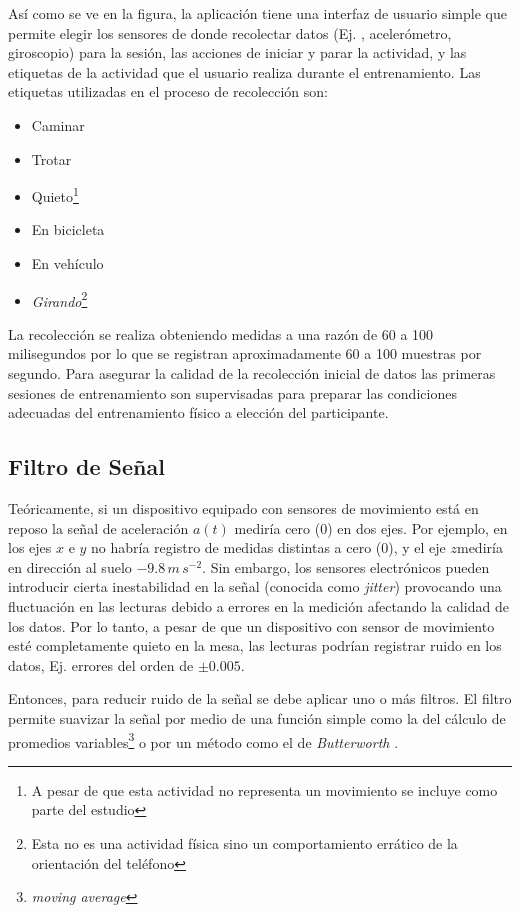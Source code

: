 Así como se ve en la figura, la aplicación tiene una interfaz de usuario
simple que permite elegir los sensores de donde recolectar datos (Ej.
, acelerómetro, giroscopio) para la sesión, las acciones
de iniciar y parar la actividad, y las etiquetas de la actividad que
el usuario realiza durante el entrenamiento. Las etiquetas utilizadas
en el proceso de recolección son:
\begin{itemize}
\item Caminar
\item Trotar
\item Quieto\footnote{A pesar de que esta actividad no representa un movimiento se incluye
como parte del estudio}
\item En bicicleta
\item En vehículo
\item \emph{Girando}\footnote{Esta no es una actividad física sino un comportamiento errático de
la orientación del teléfono}
\end{itemize}
La recolección se realiza obteniendo medidas a una razón de 60 a 100
milisegundos por lo que se registran aproximadamente 60 a 100 muestras
por segundo. Para asegurar la calidad de la recolección inicial de
datos las primeras sesiones de entrenamiento son supervisadas para
preparar las condiciones adecuadas del entrenamiento físico a elección
del participante.

\subsection{Filtro de Señal}

\label{ssec44:filtering}Teóricamente, si un dispositivo equipado
con sensores de movimiento está en reposo la señal de aceleración
$a(t)$ mediría cero (0) en dos ejes. Por ejemplo, en los ejes $x$
e $y$ no habría registro de medidas distintas a cero (0), y el eje
$z$mediría en dirección al suelo $-9.8\,m\,s^{-2}$. Sin embargo,
los sensores electrónicos pueden introducir cierta inestabilidad en
la señal (conocida como \emph{jitter}) provocando una fluctuación
en las lecturas debido a errores en la medición afectando la calidad
de los datos. Por lo tanto, a pesar de que un dispositivo con sensor
de movimiento esté completamente quieto en la mesa, las lecturas podrían
registrar ruido en los datos, Ej. errores del orden de $\pm0.005$. 

Entonces, para reducir ruido de la señal se debe aplicar uno o más
filtros. El filtro permite suavizar la señal por medio de una función
simple como la del cálculo de promedios variables\footnote{\emph{moving average}}
o por un método como el de \emph{Butterworth} \cite{ReyesOrtiz2015}. 

